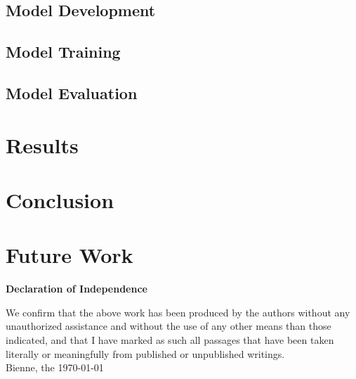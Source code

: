 \documentclass[12pt,a4paper]{scrartcl}
\begin{document}
\subsection{Model Development}
\subsection{Model Training}
\subsection{Model Evaluation}

\section{Results}\label{Results}


\newpage
\section{Conclusion}


\section{Future Work}

\markboth{}{}

\newpage





\newpage
\thispagestyle{empty}
\markboth{}{}
  \normalsize
\begin{center}
\huge{\textbf{ Declaration of Independence}}\\[40mm]
\end{center}
\large
We confirm that the above work has been produced by the authors without any unauthorized assistance and without the use of any other means than those indicated, and that I have marked as such all passages that have been taken literally or meaningfully from published or unpublished writings.\\[50mm]
Bienne, the \today

\newpage
\end{document}
